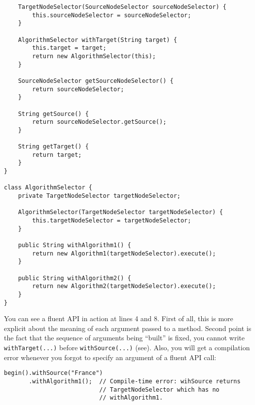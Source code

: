 \documentclass{book}
\begin{document}
\begin{lstlisting}
    TargetNodeSelector(SourceNodeSelector sourceNodeSelector) {
        this.sourceNodeSelector = sourceNodeSelector;
    }
    
    AlgorithmSelector withTarget(String target) {
        this.target = target;
        return new AlgorithmSelector(this);
    }
    
    SourceNodeSelector getSourceNodeSelector() {
        return sourceNodeSelector;
    }
    
    String getSource() {
        return sourceNodeSelector.getSource();
    }
    
    String getTarget() {
        return target;
    }
}

class AlgorithmSelector {
    private TargetNodeSelector targetNodeSelector;
    
    AlgorithmSelector(TargetNodeSelector targetNodeSelector) {
        this.targetNodeSelector = targetNodeSelector;
    } 
    
    public String withAlgorithm1() {
        return new Algorithm1(targetNodeSelector).execute();
    }
    
    public String withAlgorithm2() {
        return new Algorithm2(targetNodeSelector).execute();
    }
}
\end{lstlisting}
You can see a fluent API in action at lines 4 and 8. First of all, this is more explicit about the meaning of each argument passed to a method. Second point is the fact that the sequence of arguments being ``built'' is fixed, you cannot write \texttt{withTarget(...)} before \texttt{withSource(...)} (see). Also, you will get a compilation error whenever you forgot to specify an argument of a fluent API call:
\newpage
\begin{lstlisting}
begin().withSource("France")
       .withAlgorithm1();  // Compile-time error: wihSource returns 
                           // TargetNodeSelector which has no 
                           // withAlgorithm1.
\end{lstlisting}
\end{document}

